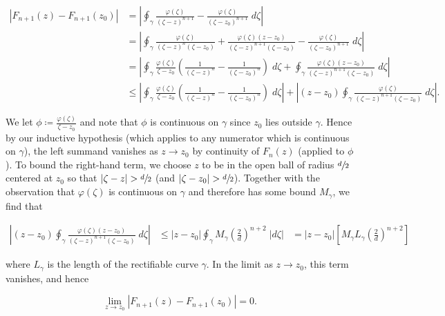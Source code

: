 \begin{solution}
    \begin{align*}
        \left|F_{n+1}(z) - F_{n+1}(z_0)\right| 
          &= \left|\oint_{\gamma} {\frac{\varphi(\zeta)}{(\zeta - z)^{n+1}} - \frac{\varphi(\zeta)}{(\zeta - z_0)^{n+1}} \; d\zeta} \right| \\
          &= \left|\oint_{\gamma} {\frac{\varphi(\zeta)}{(\zeta - z)^{n}(\zeta - z_0)} + \frac{\varphi(\zeta)(z - z_0)}{(\zeta - z)^{n+1}(\zeta - z_0)} - \frac{\varphi(\zeta)}{(\zeta - z_0)^{n+1}} \; d\zeta} \right| \\
          &= \left|\oint_{\gamma} {\frac{\varphi(\zeta)}{\zeta - z_0}\left(\frac{1}{(\zeta - z)^{n}} - \frac{1}{(\zeta - z_0)^{n}} \right) \; d\zeta} + \oint_{\gamma} {\frac{\varphi(\zeta)(z - z_0)}{(\zeta - z)^{n+1}(\zeta - z_0)} \; d\zeta} \right| \\
          &\le \left|\oint_{\gamma} {\frac{\varphi(\zeta)}{\zeta - z_0}\left(\frac{1}{(\zeta - z)^{n}} - \frac{1}{(\zeta - z_0)^{n}} \right) \; d\zeta} \right| + \left|(z - z_0) \oint_{\gamma} {\frac{\varphi(\zeta)}{(\zeta - z)^{n+1}(\zeta - z_0)} \; d\zeta} \right|.
    \end{align*}

    We let $\phi \coloneqq \frac{\varphi(\zeta)}{\zeta - z_0}$ and note that $\phi$ is continuous on $\gamma$ since
    $z_0$ lies outside $\gamma$. Hence by our inductive hypothesis (which applies to any numerator which is continuous 
    on $\gamma$), the left summand vanishes as $z \to z_0$ by continuity of $F_n(z)$ (applied to $\phi$). To bound the 
    right-hand term, we choose $z$ to be in the open ball of radius $\sfrac{d}{2}$ centered at $z_0$ so that 
    $|\zeta - z| > \sfrac{d}{2}$ (and $|\zeta - z_0| > \sfrac{d}{2}$). Together with the observation that 
    $\varphi(\zeta)$ is continuous on $\gamma$ and therefore has some bound $M_{\gamma}$, we find that

    \begin{align*}
        \left|(z - z_0) \oint_{\gamma} {\frac{\varphi(\zeta)(z - z_0)}{(\zeta - z)^{n+1}(\zeta - z_0)} \; d\zeta} \right| 
          &\le |z - z_0| \oint_{\gamma} { M_{\gamma} \left(\frac{2}{d}\right)^{n+2} \; |d\zeta| }
          &= |z - z_0| \left[ M_{\gamma} L_{\gamma} \left(\frac{2}{d}\right)^{n+2} \right]
    \end{align*}

    where $L_{\gamma}$ is the length of the rectifiable curve $\gamma$. In the limit as $z \to z_0$, this
    term vanishes, and hence

    $$
    \lim_{z \to z_0} \left|F_{n+1}(z) - F_{n+1}(z_0)\right| = 0.
    $$


\end{solution}
